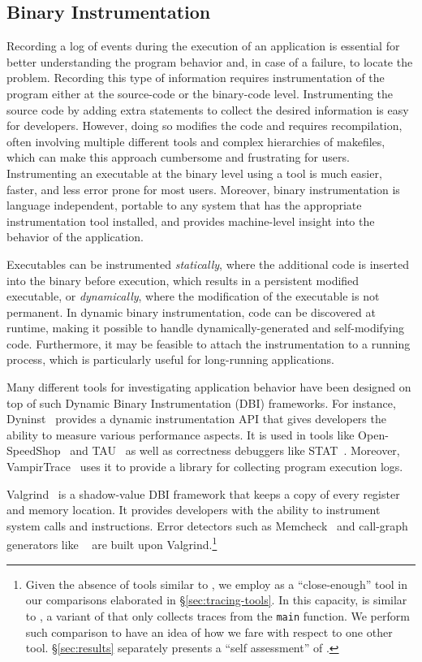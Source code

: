 \subsection{Binary Instrumentation}
Recording a log of events during the execution of an application is essential for better understanding the program behavior and, in case of a failure, to locate the problem. Recording this type of information requires instrumentation of the program either at the source-code or the binary-code level. Instrumenting the source code by adding extra statements to collect the desired information is easy for developers. However, doing so modifies the code and requires recompilation, often involving multiple different tools and complex hierarchies of makefiles, which can make this approach cumbersome and frustrating for users. Instrumenting an executable at the binary level using a tool is much easier, faster, and less error prone for most users. Moreover, binary instrumentation is language independent, portable to any system that has the appropriate instrumentation tool installed, and provides machine-level insight into the behavior of the application.

Executables can be instrumented \textit{statically}, where the additional code is inserted into the binary before execution, which results in a persistent modified executable, or \textit{dynamically}, where the modification of the executable is not permanent. In dynamic binary instrumentation, code can be discovered at runtime, making it possible to handle dynamically-generated and self-modifying code. Furthermore, it may be feasible to attach the instrumentation to a running process, which is particularly useful for long-running applications.

Many different tools for investigating application behavior have been designed on top of such Dynamic Binary Instrumentation (DBI) frameworks. For instance, Dyninst~\cite{dyninst} provides a dynamic instrumentation API that gives developers the ability to measure various performance aspects. It is used in tools like Open-SpeedShop~\cite{openss} and TAU~\cite{tau} as well as correctness debuggers like STAT~\cite{stat}. Moreover, VampirTrace~\cite{vampirt} uses it to provide a library for collecting program execution logs. 

Valgrind~\cite{valgrind} is a shadow-value DBI framework that keeps a copy of every register and memory location. It provides developers with the ability to instrument system calls and instructions. Error detectors such as Memcheck~\cite{memcheck} and call-graph generators like \callgrind~\cite{callgrind} are built upon Valgrind.\footnote{Given the absence of tools similar to \parlot, we employ \callgrind
 as a ``close-enough'' tool in our comparisons elaborated in \S\ref{sec:tracing-tools}.
 In this capacity, \callgrind is similar to \parlotm, a variant of \parlot that only collects
 traces from the {\tt main} function. We perform such comparison to have an idea of how we fare
 with respect to one other tool. \S\ref{sec:results} separately
 presents a ``self assessment'' of \parlot.}

